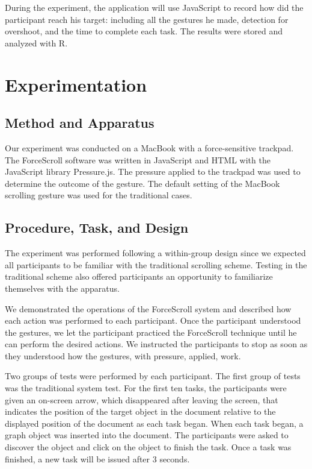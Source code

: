 \documentclass{sigchi}
\begin{document}
During the experiment, the application will use JavaScript to record how did the participant reach his target: including all the gestures he made, detection for overshoot, and the time to complete each task. The results were stored and analyzed with R.


\section{Experimentation}
\subsection{Method and Apparatus}
Our experiment was conducted on a MacBook with a force-sensitive trackpad. The ForceScroll software was written in JavaScript and HTML with the JavaScript library Pressure.js. The pressure applied to the trackpad was used to determine the outcome of the gesture. The default setting of the MacBook scrolling gesture was used for the traditional cases.
\subsection{Procedure, Task, and Design}
The experiment was performed following a within-group design since we expected all participants to be familiar with the traditional scrolling scheme. Testing in the traditional scheme also offered participants an opportunity to familiarize themselves with the apparatus.

We demonstrated the operations of the ForceScroll system and described how each action was performed to each participant. Once the participant understood the gestures, we let the participant practiced the ForceScroll technique until he can perform the desired actions. We instructed the participants to stop as soon as they understood how the gestures, with pressure, applied, work.

Two groups of tests were performed by each participant. The first group of tests was the traditional system test. For the first ten tasks, the participants were given an on-screen arrow, which disappeared after leaving the screen, that indicates the position of the target object in the document relative to the displayed position of the document as each task began. When each task began, a graph object was inserted into the document. The participants were asked to discover the object and click on the object to finish the task. Once a task was finished, a new task will be issued after 3 seconds. 
\end{document}
